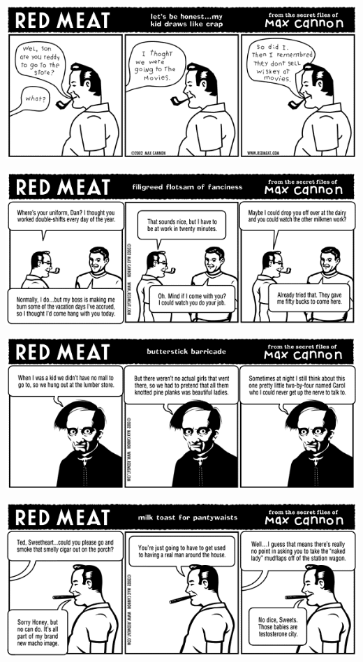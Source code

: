 \documentclass[a4paper,twoside,11pt]{article}
\begin{document}
\includegraphics[width=\textwidth]{redmeat_2002-05-14.png}



\includegraphics[width=\textwidth]{redmeat_2002-05-21.png}



\includegraphics[width=\textwidth]{redmeat_2002-05-28.png}



\includegraphics[width=\textwidth]{redmeat_2002-06-04.png}
\end{document}
